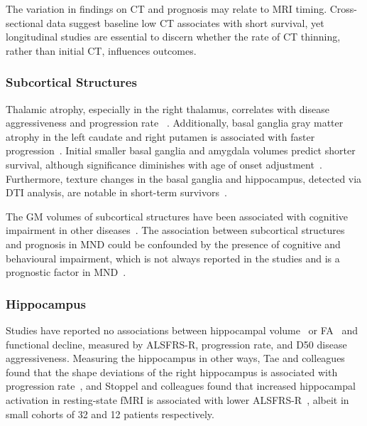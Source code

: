 The variation in findings on CT and prognosis may relate to MRI timing.
Cross-sectional data suggest baseline low CT associates with short survival, yet longitudinal studies are essential to discern whether the rate of CT thinning, rather than initial CT, influences outcomes.

\subsubsection*{Subcortical Structures}

Thalamic atrophy, especially in the right thalamus, correlates with disease aggressiveness and progression rate ~\cite{dieckmannCorticalSubcorticalGrey2022, johnsQuantifyingChangesSusceptibility2019}.
Additionally, basal ganglia gray matter atrophy in the left caudate and right putamen is associated with faster progression~\cite{sendaStructuralMRICorrelates2017, agostaLongitudinalAssessmentGrey2009}.
Initial smaller basal ganglia and amygdala volumes predict shorter survival, although significance diminishes with age of onset adjustment~\cite{westenengSubcorticalStructuresAmyotrophic2015}.
Furthermore, texture changes in the basal ganglia and hippocampus, detected via DTI analysis, are notable in short-term survivors~\cite{ishaqueEvaluatingCerebralCorrelates2018}.

The GM volumes of subcortical structures have been associated with cognitive impairment in other diseases~\cite{yiRelationSubcorticalGrey2016}.
The association between subcortical structures and prognosis in MND could be confounded by the presence of cognitive and behavioural impairment, which is not always reported in the studies and is a prognostic factor in MND~\cite{suPredictorsSurvivalPatients2021}.

\subsubsection*{Hippocampus}
Studies have reported no associations between hippocampal volume~\cite{abdullaHippocampalDegenerationPatients2014, dieckmannCorticalSubcorticalGrey2022} or FA~\cite{mullerLargescaleMulticentreCerebral2016} and functional decline, measured by ALSFRS-R, progression rate, and D50 disease aggressiveness.
Measuring the hippocampus in other ways, Tae and colleagues found that the shape deviations of the right hippocampus is associated with progression rate~\cite{taeShapeAnalysisSubcortical2020}, and Stoppel and colleagues found that increased hippocampal activation in resting-state fMRI is associated with lower ALSFRS-R~\cite{stoppelStructuralFunctionalHallmarks2014}, albeit in small cohorts of 32 and 12 patients respectively.

